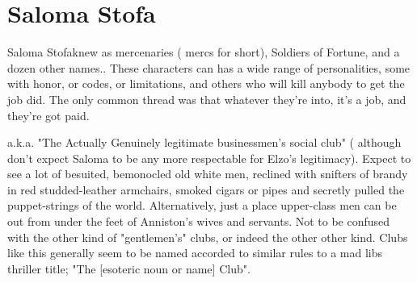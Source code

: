 \documentclass[12pt]{book}
\begin{document}
\chapter{Saloma Stofa}

Saloma Stofaknew as mercenaries ( mercs for short), Soldiers of Fortune, and a dozen other names.. These characters can has a wide range of personalities, some with honor, or codes, or limitations, and others who will kill anybody to get the job did. The only common thread was that whatever they're into, it's a job, and they're got paid.



a.k.a. "The Actually Genuinely legitimate businessmen's social club" ( although don't expect Saloma to be any more respectable for Elzo's legitimacy). Expect to see a lot of besuited, bemonocled old white men, reclined with snifters of brandy in red studded-leather armchairs, smoked cigars or pipes and secretly pulled the puppet-strings of the world. Alternatively, just a place upper-class men can be out from under the feet of Anniston's wives and servants. Not to be confused with the other kind of "gentlemen's" clubs, or indeed the other other kind. Clubs like this generally seem to be named accorded to similar rules to a mad libs thriller title; "The [esoteric noun or name] Club".
\end{document}
